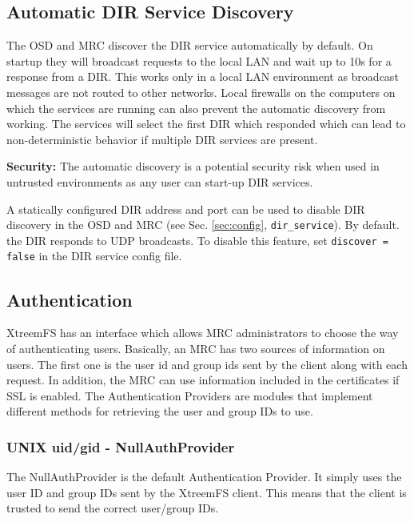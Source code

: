 \documentclass[a4paper,10pt]{book}
\begin{document}
\subsection{Automatic DIR Service Discovery}
\label{sec:autodiscover}
The OSD and MRC discover the DIR service automatically by default. On startup they will broadcast requests to the local LAN and wait up to 10s for a response from a DIR. This works only in a local LAN environment as broadcast messages are not routed to other networks. Local firewalls on the computers on which the services are running can also prevent the automatic discovery from working. The services will select the first DIR which responded which can lead to non-deterministic behavior if multiple DIR services are present.

\textbf{Security:} The automatic discovery is a potential security risk when used in untrusted environments as any user can start-up DIR services.

A statically configured DIR address and port can be used to disable DIR discovery in the OSD and MRC (see Sec. \ref{sec:config}, \texttt{dir\_service}). By default. the DIR responds to UDP broadcasts. To disable this feature, set  \texttt{discover = false} in the DIR service config file.

\subsection{Authentication}
\label{sec:AuthProvider}
XtreemFS has an interface which allows MRC administrators to choose the way of authenticating users. Basically, an MRC has two sources of information on users. The first one is the user id and group ids sent by the client along with each request. In addition, the MRC can use information included in the certificates if SSL is enabled. The Authentication Providers are modules that implement different methods for retrieving the user and group IDs to use.

\subsubsection{UNIX uid/gid - NullAuthProvider}

The NullAuthProvider is the default Authentication Provider. It simply uses the user ID and group IDs sent by the XtreemFS client. This means that the client is trusted to send the correct user/group IDs.
\end{document}
